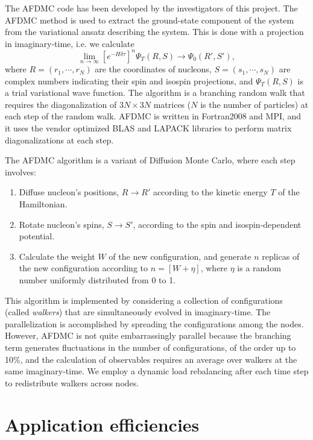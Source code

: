 \documentclass[12pt,letterpaper]{article}
\begin{document}
The AFDMC code has been developed by the investigators of this project. The 
AFDMC method is used to extract the ground-state component of the system 
from the variational ansatz describing the system. This is done with a 
projection in imaginary-time, i.e. we calculate
\begin{equation}
\label{eq:dif}
\lim_{n\rightarrow\infty}\left[ e^{-H\delta\tau}\right]^n \Psi_T(R,S) 
\rightarrow \Psi_0(R',S'),
\end{equation}
where $R =(r_1, \cdots, r_N)$ are the coordinates of nucleons, $S = (s_1, 
\cdots, s_N)$ are complex numbers indicating their spin and isospin 
projections, and $\Psi_T(R,S)$ is a trial variational wave function. The 
algorithm is a branching random walk that requires the diagonalization of 
$3N \times 3N$ matrices ($N$ is the number of particles) at each step of the 
random walk. AFDMC is written in Fortran2008 and MPI, and it uses the vendor 
optimized BLAS and LAPACK libraries to perform matrix diagonalizations at 
each step.

The AFDMC algorithm is a variant of Diffusion Monte Carlo, where each step 
involves:
\begin{enumerate}
\item Diffuse nucleon’s positions, $R \rightarrow R'$ according to the 
kinetic energy $T$ of the Hamiltonian.
\item Rotate nucleon’s spins, $S \rightarrow S'$, according to the spin and 
isospin-dependent potential.
\item Calculate the weight $W$ of the new configuration, and generate $n$ 
replicas of the new configuration according to $n = [W + \eta]$, where 
$\eta$  is a random number uniformly distributed from 0 to 1.
\end{enumerate}

This algorithm is implemented by considering
a collection of configurations (called \textit{walkers})
that are simultaneously evolved in imaginary-time. The parallelization is 
accomplished
by spreading the configurations among the nodes. However, AFDMC is not quite
embarrassingly parallel because the branching term generates fluctuations in 
the number of configurations, of the order up to 10\%, and the calculation 
of observables requires an average over walkers at the same imaginary-time. 
We employ a dynamic load rebalancing after
each time step to redistribute walkers across nodes.

\section{Application efficiencies}
\end{document}
